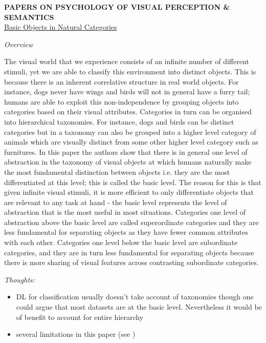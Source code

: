 \documentclass{report}
\begin{document}
\newpage

\textbf{PAPERS ON PSYCHOLOGY OF VISUAL PERCEPTION \& SEMANTICS} \\ 

\underline{Basic Objects in Natural Categories \cite{Rosch1976}}

\textit{Overview}

The visual world that we experience consists of an infinite number of different stimuli, yet we are able to classify this environment into distinct objects. This is because there is an inherent correlative structure in real world objects. For instance, dogs never have wings and birds will not in general have a furry tail; humans are able to exploit this non-independence by grouping objects into categories based on their visual attributes. Categories in turn can be organised into hierarchical taxonomies. For instance, dogs and birds can be distinct categories but in a taxonomy can also be grouped into a higher level category of animals which are visually distinct from some other higher level category such as furnitures. In this paper the authors show that there is in general one level of abstraction in the taxonomy of visual objects at which humans naturally make the most fundamental distinction between objects i.e. they are the most differentiated at this level; this is called the basic level. The reason for this is that given infinite visual stimuli, it is more efficient to only differentiate objects that are relevant to any task at hand - the basic level represents the level of abstraction that is the most useful in most situations. Categories one level of abstraction above the basic level are called superordinate categories and they are less fundamental for separating objects as they have fewer common attributes with each other. Categories one level below the basic level are subordinate categories, and they are in turn less fundamental for separating objects because there is more sharing of visual features across contrasting subordinate categories.

\textit{Thoughts:}
\begin{itemize}
  \item DL for classification usually doesn't take account of taxonomies though one could argue that most datasets are at the basic level. Nevertheless it would be of benefit to account for entire hierarchy 
  \item several limitations in this paper (see \cite{Joliceur1984}) \\
\end{itemize}
\end{document}
